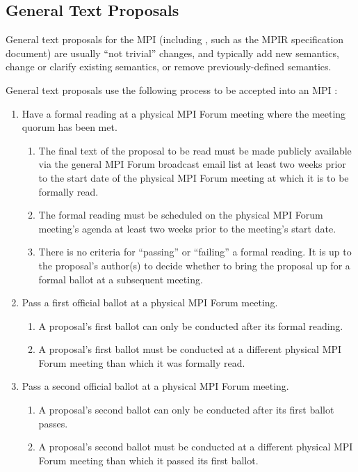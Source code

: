 
\subsection{General Text Proposals}

General text proposals for the MPI {\color{red}{Standard Document}} (including
{\color{red}{MPI Companion Documents}}, such as the MPIR specification
document) are usually ``not trivial'' changes, and typically add new
semantics, change or clarify existing semantics, or remove
previously-defined semantics.

General text proposals use the following process to be accepted into
an MPI {\color{red}{Standard Document}}:

\begin{enumerate}
\item Have a formal reading at a physical MPI Forum meeting where the
  meeting quorum has been met.
  \begin{enumerate}
  \item The final text of the proposal to be read must be made
    publicly available via the general MPI Forum broadcast email list
    at least two weeks prior to the start date of the physical MPI
    Forum meeting at which it is to be formally read.
  \item The formal reading must be scheduled on the physical MPI Forum
    meeting's agenda at least two weeks prior to the meeting's start
    date.
  \item There is no criteria for ``passing'' or ``failing'' a formal
    reading.  It is up to the proposal's author(s) to decide whether
    to bring the proposal up for a formal ballot at a subsequent
    meeting.
  \end{enumerate}

\item Pass a first official ballot at a physical MPI Forum meeting.
  \begin{enumerate}
  \item A proposal's first ballot can only be conducted after its
    formal reading.
  \item A proposal's first ballot must be conducted at a different
    physical MPI Forum meeting than which it was formally read.
  \end{enumerate}

\item Pass a second official ballot at a physical MPI Forum meeting.
  \begin{enumerate}
  \item A proposal's second ballot can only be conducted after its
    first ballot passes.
  \item A proposal's second ballot must be conducted at a different
    physical MPI Forum meeting than which it passed its first ballot.
  \end{enumerate}


\end{enumerate}

